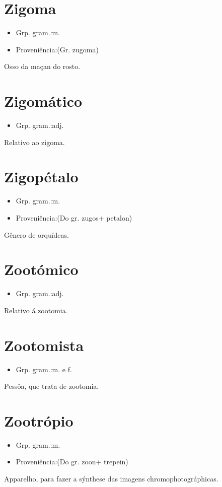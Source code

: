 \section{Zigoma}
\begin{itemize}
\item {Grp. gram.:m.}
\end{itemize}
\begin{itemize}
\item {Proveniência:(Gr. \textunderscore zugoma\textunderscore )}
\end{itemize}
Osso da maçan do rosto.
\section{Zigomático}
\begin{itemize}
\item {Grp. gram.:adj.}
\end{itemize}
Relativo ao zigoma.
\section{Zigopétalo}
\begin{itemize}
\item {Grp. gram.:m.}
\end{itemize}
\begin{itemize}
\item {Proveniência:(Do gr. \textunderscore zugos\textunderscore  + \textunderscore petalon\textunderscore )}
\end{itemize}
Gênero de orquídeas.
\section{Zootómico}
\begin{itemize}
\item {Grp. gram.:adj.}
\end{itemize}
Relativo á zootomia.
\section{Zootomista}
\begin{itemize}
\item {Grp. gram.:m.  e  f.}
\end{itemize}
Pessôa, que trata de zootomia.
\section{Zootrópio}
\begin{itemize}
\item {Grp. gram.:m.}
\end{itemize}
\begin{itemize}
\item {Proveniência:(Do gr. \textunderscore zoon\textunderscore  + \textunderscore trepein\textunderscore )}
\end{itemize}
Apparelho, para fazer a sýnthese das imagens chromophotográphicas.
